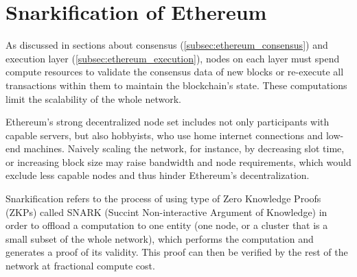 \section{Snarkification of Ethereum}\label{sec:snarkification}

As discussed in sections about consensus (\ref{subsec:ethereum_consensus}) and
execution layer (\ref{subsec:ethereum_execution}), nodes on each layer must spend
compute resources to validate the consensus data of new blocks or re-execute all
transactions within them to maintain the blockchain's state.
These computations limit the scalability of the whole network.

Ethereum's strong
decentralized node set includes not only participants with capable servers,
but also hobbyists, who use home internet connections and low-end machines.
Naively scaling the network, for instance, by decreasing slot time, or increasing
block size may raise bandwidth and node requirements, which would exclude
less capable nodes and thus hinder Ethereum's decentralization.

Snarkification refers to the process of using type of Zero Knowledge Proofs (ZKPs)
called SNARK (Succint Non-interactive Argument of Knowledge) in order to offload
a computation to one entity (one node, or a cluster that is a small subset of
the whole network), which performs the computation and generates a proof of
its validity. This proof can then be verified by the rest of the network
at fractional compute cost.


